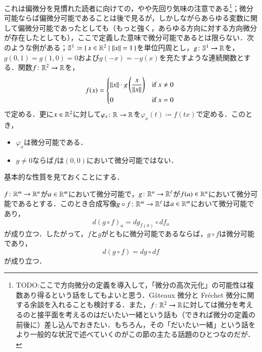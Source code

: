 \begin{que}
これは偏微分を見慣れた読者に向けての，やや先回り気味の注意である\footnote{TODO:ここで方向微分の定義を導入して，「微分の高次元化」の可能性は複数あり得るという話をしてもよいと思う．G\^ateaux 微分と Fr\'echet 微分に関する余談を入れることも検討する．また，$f \colon \mathbb{R}^2 \to \mathbb{R}$に対しては微分を考えるのと接平面を考えるのはだいたい一緒という話も（できれば微分の定義の前後に）差し込んでおきたい．もちろん，その「だいたい一緒」という話をより一般的な状況で述べていくのがこの節の主たる話題のひとつなのだが．}；微分可能ならば偏微分可能であることは後で見るが，しかしながらあらゆる変数に関して偏微分可能であったとしても（もっと強く，あらゆる方向に対する方向微分が存在したとしても），ここで定義した意味で微分可能であるとは限らない．次のような例がある；$\mathbb{S}^1 \coloneqq \set{x \in \mathbb{R}^2 | \|x\|=1}$を単位円周とし，$g \colon \mathbb{S}^1 \to \mathbb{R}$を，$g(0,1) = g(1,0) = 0$および$g(-x)=-g(x)$を充たすような連続関数とする．関数$f \colon \mathbb{R}^2 \to \mathbb{R}$を，
\begin{equation}
f(x) =   \begin{dcases*}
    \|x\| \cdot g\left( \frac{x}{\|x\|} \right) & if $x \neq 0$ \\
    0 & if $x=0$
  \end{dcases*}
\end{equation}
で定める．更に$x \in \mathbb{R}^2$に対して$\varphi_x \colon \mathbb{R} \to \mathbb{R}$を$\varphi_x(t) \coloneqq f(tx)$で定める．このとき，
\begin{itemize}
\item $\varphi_x$は微分可能である．
\item $g \neq 0$ならば$f$は$(0,0)$において微分可能ではない．
\end{itemize}
\end{que}

基本的な性質を見ておくことにする．

\begin{prop}
$f \colon \mathbb{R}^m \to \mathbb{R}^n$が$a \in \mathbb{R}^m$において微分可能で，$g \colon \mathbb{R}^n \to \mathbb{R}^\ell$が$f(a) \in \mathbb{R}^n$において微分可能であるとする．このとき合成写像$g \circ f \colon \mathbb{R}^m \to \mathbb{R}^\ell$は$a \in \mathbb{R}^m$において微分可能であり，
\begin{equation}
d(g \circ f)_{a} = dg_{f(a)} \circ df_a
\end{equation}が成り立つ．したがって，$f$と$g$がともに微分可能であるならば，$g \circ f$は微分可能であり，
\begin{equation}
d(g \circ f) = dg \circ df
\end{equation}が成り立つ．
\end{prop}

